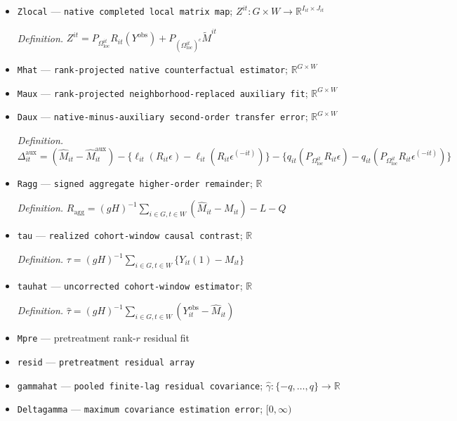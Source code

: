 \documentclass{article}
\begin{document}
\begin{itemize}
  \item \texttt{Zlocal} --- \texttt{native completed local matrix map}; \(Z^{it}:G\times W\to\mathbb R^{I_{it}\times J_{it}}\)
  \par\smallskip\noindent\emph{Definition.} \(Z^{it}=P_{\Omega_{\mathrm{loc}}^{it}}R_{it}(Y^{\mathrm{obs}})+P_{(\Omega_{\mathrm{loc}}^{it})^c}\widetilde M^{it}\)
  \item \texttt{Mhat} --- \texttt{rank-\allowbreak{}projected native counterfactual estimator}; \(\mathbb R^{G\times W}\)
  \item \texttt{Maux} --- \texttt{rank-\allowbreak{}projected neighborhood-\allowbreak{}replaced auxiliary fit}; \(\mathbb R^{G\times W}\)
  \item \texttt{Daux} --- \texttt{native-\allowbreak{}minus-\allowbreak{}auxiliary second-\allowbreak{}order transfer error}; \(\mathbb R^{G\times W}\)
  \par\smallskip\noindent\emph{Definition.} \(\Delta^{\mathrm{aux}}_{it}=(\widehat M_{it}-\widehat M^{\mathrm{aux}}_{it})-\{\ell_{it}(R_{it}\epsilon)-\ell_{it}(R_{it}\epsilon^{(-it)})\}-\{q_{it}(P_{\Omega_{\mathrm{loc}}^{it}}R_{it}\epsilon)-q_{it}(P_{\Omega_{\mathrm{loc}}^{it}}R_{it}\epsilon^{(-it)})\}\)
  \item \texttt{Ragg} --- \texttt{signed aggregate higher-\allowbreak{}order remainder}; \(\mathbb R\)
  \par\smallskip\noindent\emph{Definition.} \(R_{\mathrm{agg}}=(gH)^{-1}\sum_{i\in G,t\in W}(\widehat M_{it}-M_{it})-L-Q\)
  \item \texttt{tau} --- \texttt{realized cohort-\allowbreak{}window causal contrast}; \(\mathbb R\)
  \par\smallskip\noindent\emph{Definition.} \(\tau=(gH)^{-1}\sum_{i\in G,t\in W}\{Y_{it}(1)-M_{it}\}\)
  \item \texttt{tauhat} --- \texttt{uncorrected cohort-\allowbreak{}window estimator}; \(\mathbb R\)
  \par\smallskip\noindent\emph{Definition.} \(\widehat\tau=(gH)^{-1}\sum_{i\in G,t\in W}(Y^{\mathrm{obs}}_{it}-\widehat M_{it})\)
  \item \texttt{Mpre} --- pretreatment rank-\(r\) residual fit
  \item \texttt{resid} --- \texttt{pretreatment residual array}
  \item \texttt{gammahat} --- \texttt{pooled finite-\allowbreak{}lag residual covariance}; \(\widehat\gamma:\{-q,\ldots,q\}\to\mathbb R\)
  \item \texttt{Deltagamma} --- \texttt{maximum covariance estimation error}; \([0,\infty)\)

\end{itemize}
\end{document}
